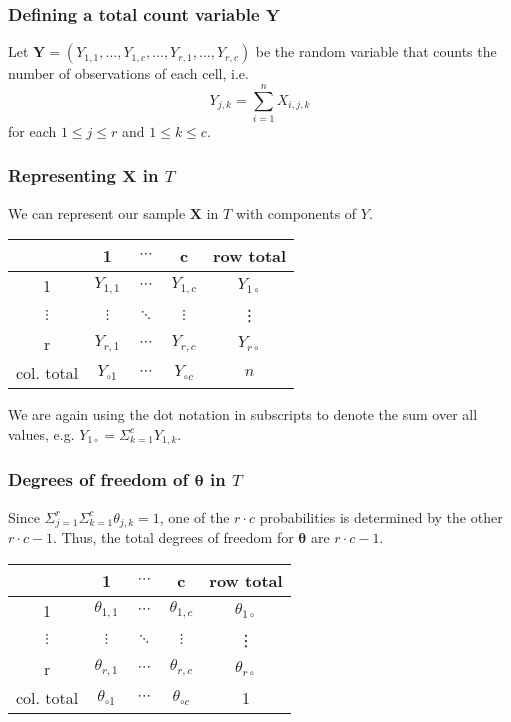 \documentclass{beamer}
\begin{document}
\begin{frame}
\frametitle{Defining a total count variable $\textbf{Y}$}
Let $\textbf{Y} = (Y_{1,1}, \ldots, Y_{1,c}, \ldots, Y_{r,1}, \ldots, Y_{r,c})$ be the random variable that counts the number of observations of each cell, i.e. 
\[Y_{j,k} = \sum_{i=1}^nX_{i,j,k}\]
for each $1\le j\le r$ and $1\le k\le c$.

\end{frame}

\begin{frame}
\frametitle{Representing $\textbf{X}$ in $T$}
We can represent our sample $\textbf{X}$ in $T$ with components of $Y$.
\begin{center}
	\begin{tabular}{ |c|c|c|c|c| } 
		\hline
		&1 & $\cdots$ & c&row total \\ 
		\hline
		1&$Y_{1,1}$ &$\cdots$ & $Y_{1,c}$&$Y_{1\circ}$ \\ 
		\hline
		$\vdots$& $\vdots$& $\ddots$ & $\vdots$&\vdots \\ 
		\hline
		r&$Y_{r,1}$ & $\cdots$ & $Y_{r,c}$&$Y_{r\circ}$ \\ 
		\hline
		col. total&$Y_{\circ 1}$ & $\cdots$ & $Y_{\circ c}$&$n$ \\ 
		\hline
	\end{tabular}
\end{center}
We are again using the dot notation in subscripts to denote the sum over all values, e.g. $Y_{1\circ} = \Sigma_{k=1}^cY_{1,k}$.

\end{frame}

\begin{frame}
\frametitle{Degrees of freedom of $\boldsymbol{\theta}$ in $T$}
Since $\Sigma_{j=1}^r\Sigma_{k=1}^c\theta_{j,k} = 1$, one of the $r\cdot c$ probabilities is determined by the other $r\cdot c-1$. Thus, the total degrees of freedom for $\boldsymbol{\theta}$ are $r\cdot c-1$.
\begin{center}
	\begin{tabular}{ |c|c|c|c|c| } 
		\hline
		&1 & $\cdots$ & c&row total \\ 
		\hline
		1&$\theta_{1,1}$ &$\cdots$ & $\theta_{1,c}$&$\theta_{1\circ}$ \\ 
		\hline
		$\vdots$& $\vdots$& $\ddots$ & $\vdots$&\vdots \\ 
		\hline
		r&$\theta_{r,1}$ & $\cdots$ & $\theta_{r,c}$&$\theta_{r\circ}$ \\ 
		\hline
		col. total&$\theta_{\circ1}$ & $\cdots$ & $\theta_{\circ c}$&1 \\ 
		\hline
	\end{tabular}
\end{center}
\end{frame}
\end{document}
